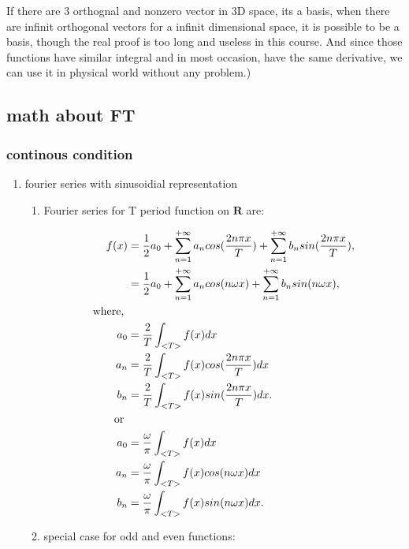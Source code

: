 \documentclass[11pt]{article}
\begin{document}
If there are 3 orthognal and nonzero vector in 3D space, its a basis, when there are infinit orthogonal vectors for a infinit dimensional space, it is possible to be a basis, though the real proof is too long and useless in this course. And since those functions have similar integral and in most occasion, have the same derivative, we can use it in physical world without any problem.)
\subsection{math about FT}
\label{sec:orgf9897fe}
\subsubsection{continous condition}
\label{sec:org5e2515f}
\begin{enumerate}
\item fourier series with sinusoidial representation
\label{sec:org44155fe}
\begin{enumerate}
\item Fourier series for T period function on \(\mathbf{R}\) are:
\label{sec:org4c022ca}

\begin{align}
  f(x) & =
         \frac{1}{2}a_0
         +
         \sum_{n = 1}^{+\infty}a_n  cos(\frac{2 n \pi x}{T})
         +
         \sum_{n = 1}^{+\infty}b_n  sin(\frac{2 n \pi x}{T}), \notag \\
       & =
         \frac{1}{2}a_0
         +
         \sum_{n = 1}^{+\infty}a_n  cos(n \omega x)
         +
         \sum_{n = 1}^{+\infty}b_n  sin(n \omega x), \notag \\
  \text{where, } & \notag \\
  a_0 & = \frac{2}{T} \int_{<T>}f(x)dx \notag \\
  a_n & = \frac{2}{T} \int_{<T>}f(x) cos(\frac{2 n \pi x}{T}) dx \notag \\
  b_n & = \frac{2}{T} \int_{<T>}f(x) sin(\frac{2 n \pi x}{T}) dx. \notag \\
  \text{or } & \notag \\
  a_0 & = \frac{\omega}{\pi} \int_{<T>}f(x)dx \notag \\
  a_n & = \frac{\omega}{\pi} \int_{<T>}f(x) cos(n \omega x) dx \notag \\
  b_n & = \frac{\omega}{\pi} \int_{<T>}f(x) sin(n \omega x) dx. \notag
\end{align}
\item special case for odd and even functions:
\label{sec:orgc48291a}


\end{enumerate}
\end{enumerate}
\end{document}
